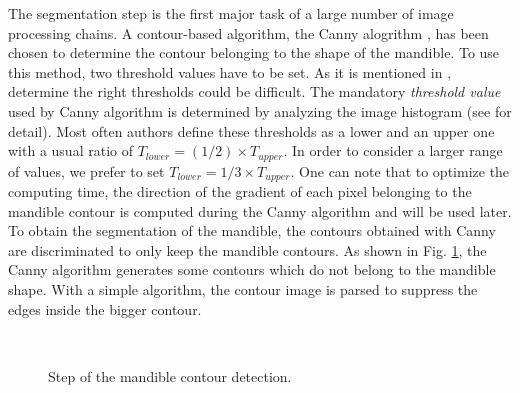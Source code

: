 \documentclass[twoside,twocolumn,10pt]{article}
\begin{document}
The segmentation step is the first major task of a large number of image processing
chains. A contour-based algorithm, the Canny alogrithm
\cite{canny1986computational}, has been chosen to determine the  contour belonging to the shape of the mandible.
To use this method, two threshold values have to be set. As it is
mentioned in \cite{adaptiveCanny}, determine the right thresholds
could be difficult. The mandatory \textit{threshold value} used by Canny algorithm is determined by analyzing the image
histogram (see \cite{leestimating} for detail). Most often authors define these thresholds as a lower and an upper one with a usual ratio of $T_{lower} = (1/2) \times T_{upper}$.
In order to consider a larger range of values, we prefer to set $T_{lower} = 1/3 \times T_{upper}$.
One can note that to optimize the computing time, the direction of the gradient of each pixel belonging to the mandible contour is computed during the Canny algorithm and will be used later.
To obtain the segmentation of the mandible, the contours obtained with Canny are discriminated to only keep the mandible contours.
As shown in Fig. \ref{canny}, the Canny algorithm generates some contours which do not belong to the mandible shape.
With a simple algorithm, the contour image is parsed to suppress the edges inside the bigger contour.
\begin{figure}[htb]
\centering
{}~~ 
\caption{Step of the mandible contour detection.}
\label{canny}
\end{figure}
\end{document}
